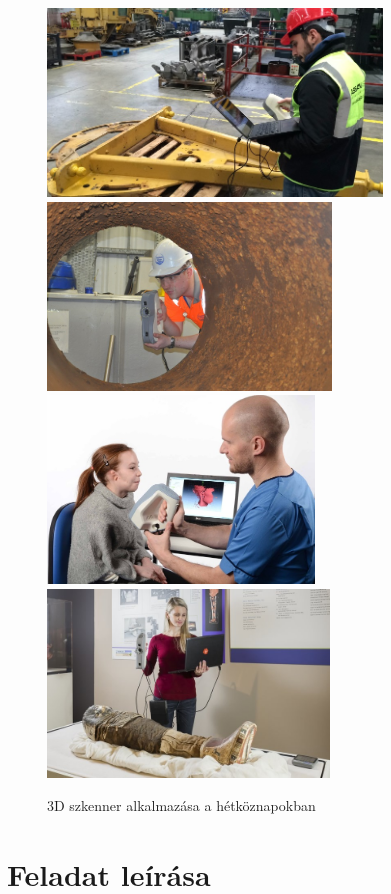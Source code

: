 \documentclass[12pt,a4paper]{article}
\begin{document}
\begin{figure}[h!]
\centering
\includegraphics[height=5cm]{images/application1.jpg}
\includegraphics[height=5cm]{images/application2.jpg}
\includegraphics[height=5cm]{images/application3.jpg}
\includegraphics[height=5cm]{images/application4.jpg}
\caption{3D szkenner alkalmazása a hétköznapokban\cite{alkalmazasok}}
\end{figure}
\newpage
\section{Feladat leírása} %
\end{document}
